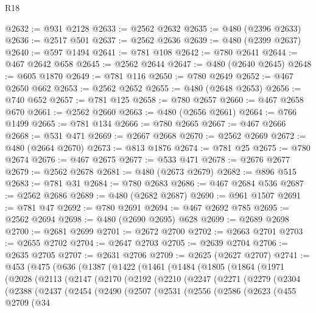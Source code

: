 \begin{lexlean}{R18}
\begin{coremodule}
@2632 := @931 @2128
@2633 := @2562 @2632
@2635 := @480 (@2396 @2633)
@2636 := @2517 @501
@2637 := @2562 @2636
@2639 := @480 (@2399 @2637)
@2640 := @597 @1494
@2641 := @781 @108
@2642 := @780 @2641
@2644 := @467 @2642 @658
@2645 := @2562 @2644
@2647 := @480 (@2640 @2645)
@2648 := @605 @1870
@2649 := @781 @116
@2650 := @780 @2649
@2652 := @467 @2650 @662
@2653 := @2562 @2652
@2655 := @480 (@2648 @2653)
@2656 := @740 @652
@2657 := @781 @125
@2658 := @780 @2657
@2660 := @467 @2658 @670
@2661 := @2562 @2660
@2663 := @480 (@2656 @2661)
@2664 := @766 @1499
@2665 := @781 @134
@2666 := @780 @2665
@2667 := @467 @2666
@2668 := @531 @471
@2669 := @2667 @2668
@2670 := @2562 @2669
@2672 := @480 (@2664 @2670)
@2673 := @813 @1876
@2674 := @781 @25
@2675 := @780 @2674
@2676 := @467 @2675
@2677 := @533 @471
@2678 := @2676 @2677
@2679 := @2562 @2678
@2681 := @480 (@2673 @2679)
@2682 := @896 @515
@2683 := @781 @31
@2684 := @780 @2683
@2686 := @467 @2684 @536
@2687 := @2562 @2686
@2689 := @480 (@2682 @2687)
@2690 := @961 @1507
@2691 := @781 @47
@2692 := @780 @2691
@2694 := @467 @2692 @785
@2695 := @2562 @2694
@2698 := @480 (@2690 @2695) @628
@2699 := @2689 @2698
@2700 := @2681 @2699
@2701 := @2672 @2700
@2702 := @2663 @2701
@2703 := @2655 @2702
@2704 := @2647 @2703
@2705 := @2639 @2704
@2706 := @2635 @2705
@2707 := @2631 @2706
@2709 := @2625 (@2627 @2707)
@2741 := @453
    (@475
      (@636
        (@1387
          (@1422
            (@1461
              (@1484
                (@1805
                  (@1864
                    (@1971
                      (@2028
                        (@2113
                          (@2147
                            (@2170
                              (@2192
                                (@2210
                                  (@2247
                                    (@2271
                                      (@2279
                                        (@2304
                                          (@2388
                                            (@2437
                                              (@2454
                                                (@2490
                                                  (@2507
                                                    (@2531
                                                      (@2556
                                                        (@2586
                                                          (@2623
                                                            (@455
                                                              @2709
                                                              (@34

\end{coremodule}
\end{lexlean}
